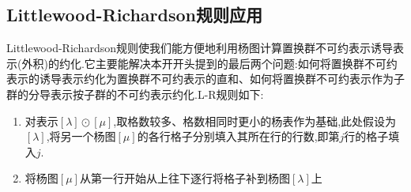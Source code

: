 \documentclass{ctexart}
\begin{document}
\subsection{Littlewood-Richardson规则应用}

Littlewood-Richardson规则使我们能方便地利用杨图计算置换群不可约表示诱导表示(外积)的约化.它主要能解决本开开头提到的最后两个问题:如何将置换群不可约表示的诱导表示约化为置换群不可约表示的直和、如何将置换群不可约表示作为子群的分导表示按子群的不可约表示约化.L-R规则如下:
\begin{enumerate}
    \item 对表示$[\lambda]\odot[\mu]$,取格数较多、格数相同时更小的杨表作为基础,此处假设为$[\lambda]$,将另一个杨图$[\mu]$的各行格子分别填入其所在行的行数,即第$j$行的格子填入$j$.
    \item 将杨图$[\mu]$从第一行开始从上往下逐行将格子补到杨图$[\lambda]$上
\end{enumerate}
\end{document}
